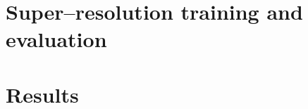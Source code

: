 \documentclass{report}
\begin{document}
\chapter{Super--resolution training and evaluation}


\chapter{Results}


\begin{appendices}
    
\end{appendices}

\listoffigures
\listoftables
\listoflistings

\nocite{*}


\end{document}
